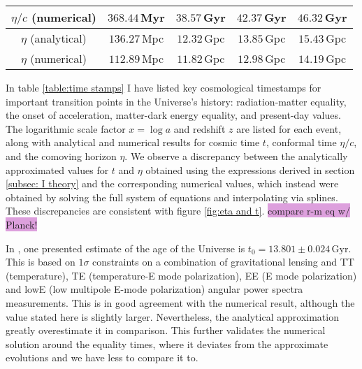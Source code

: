\documentclass{aa}
\numberwithin{equation}{section}
\numberwithin{table}{section}
\numberwithin{figure}{section}
\begin{document}
\begin{table*}
\begin{tabular}{| c || c | c | c | c |}
     $\eta/c$ (numerical) & \hspace{25pt}$368.44\,$Myr & \hspace{20.5pt}$38.57\,$Gyr & \hspace{19pt}$42.37\,$Gyr & \hspace{25pt}$46.32\,$Gyr \\ 
     \hline 
     \hspace{5.5pt}$\eta$ \hspace{3.5pt}(analytical) & \hspace{25pt}$136.27\,$Mpc & \hspace{20.5pt}$12.32\,$Gpc & \hspace{19pt}$13.85\,$Gpc & \hspace{25pt}$15.43\,$Gpc \\ 
     \hspace{5.5pt}$\eta$ \hspace{3.5pt}(numerical) & \hspace{25pt}$112.89\,$Mpc & \hspace{20.5pt}$11.82\,$Gpc & \hspace{19pt}$12.98\,$Gpc & \hspace{25pt}$14.19\,$Gpc \\ 
  \hline                                   %
  \end{tabular}
  \end{table*}

In table \ref{table:time stamps} I have listed key cosmological timestamps for important transition points in the Universe's history: radiation-matter equality, the onset of acceleration, matter-dark energy equality, and present-day values. The logarithmic scale factor $x = \log a$ and redshift $z$ are listed for each event, along with analytical and numerical results for cosmic time $t$, conformal time $\eta/c$, and the comoving horizon $\eta$. We observe a discrepancy between the analytically approximated values for $t$ and $\eta$ obtained using the expressions derived in section \ref{subsec: I theory} and the corresponding numerical values, which instead were obtained by solving the full system of equations and interpolating via splines. These discrepancies are consistent with figure \ref{fig:eta and t}. \colorbox{Plum}{compare r-m eq w/ Planck!}

In \citet{Planck}, one presented estimate of the age of the Universe is $t_0=13.801\pm0.024\,\text{Gyr}$. This is based on $1\sigma$ constraints on a combination of gravitational lensing and TT (temperature), TE (temperature-E mode polarization), EE (E mode polarization) and lowE (low multipole E-mode polarization) angular power spectra measurements. This is in good agreement with the numerical result, although the value stated here is slightly larger. Nevertheless, the analytical approximation greatly overestimate it in comparison. This further validates the numerical solution around the equality times, where it deviates from the approximate evolutions and we have less to compare it to.
\end{document}
